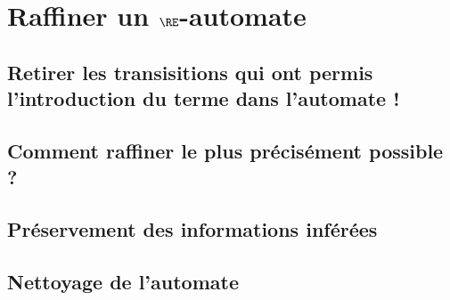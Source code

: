 \section{Raffiner un $\RE$-automate}
\subsection{Retirer les transisitions qui ont permis l'introduction du terme dans l'automate ! }
\subsection{Comment raffiner le plus précisément possible ?}
\subsection{Préservement des informations inférées}
\subsection{Nettoyage de l'automate}

\nocite{*}




